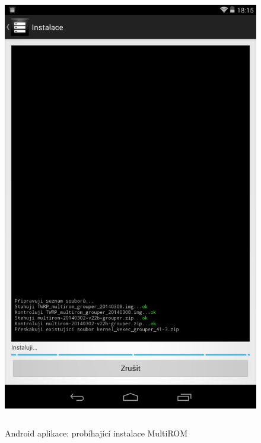 \documentclass[12pt, a4paper, oneside]{article}
\begin{document}
\begin{figure}[H]
\begin{center}
 \includegraphics[height=550pt]{../img/app_install.png}
\caption{Android aplikace: probíhající instalace MultiROM}
\end{center}
\end{figure}
\end{document}
